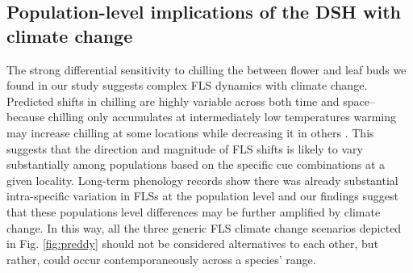 \documentclass[11pt]{article}
\begin{document}
\subsection*{Population-level implications of the DSH with climate change} %
\noindent The strong differential sensitivity to chilling the between flower and leaf buds we found in our study suggests complex FLS dynamics with climate change. Predicted shifts in chilling are highly variable across both time and space-- because chilling only accumulates at intermediately low temperatures warming may increase chilling at some locations while decreasing it in others \citep{Ettinger2020}. This suggests that the direction and magnitude of FLS shifts is likely to vary substantially among populations based on the specific cue combinations at a given locality. Long-term phenology records show there was already substantial intra-specific variation in FLSs at the population level \citep{Buonaiuto2020} and our findings suggest that these populations level differences may be further amplified by climate change. In this way, all the three generic FLS climate change scenarios depicted in Fig. \ref{fig:preddy} should not be considered alternatives to each other, but rather, could occur contemporaneously across a species' range. \\ 
\end{document}
